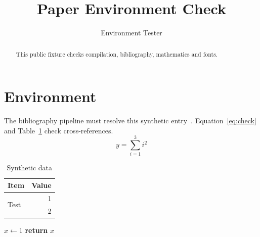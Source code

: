 \documentclass[sigplan,10pt,screen]{acmart}
\title{Paper Environment Check}
\author{Environment Tester}
\affiliation{\institution{Test Institution}\city{Test City}\country{Test Country}}
\begin{document}
\begin{abstract}
This public fixture checks compilation, bibliography, mathematics and fonts.
\end{abstract}
\maketitle
\section{Environment}
The bibliography pipeline must resolve this synthetic entry~\cite{env2026}.
Equation~\ref{eq:check} and Table~\ref{tab:check} check cross-references.
\begin{equation}\label{eq:check}
  y = \sum_{i=1}^{3} i^2
\end{equation}
\begin{table}[h]
\caption{Synthetic data}\label{tab:check}
\begin{tabular}{lr}\toprule
Item & Value \\\midrule
\multirow{2}{*}{Test} & 1 \\
 & 2 \\\bottomrule
\end{tabular}
\end{table}
\begin{algorithm}[h]
\caption{Synthetic verification}
\begin{algorithmic}
\State $x \gets 1$
\State \textbf{return} $x$
\end{algorithmic}
\end{algorithm}


\end{document}
